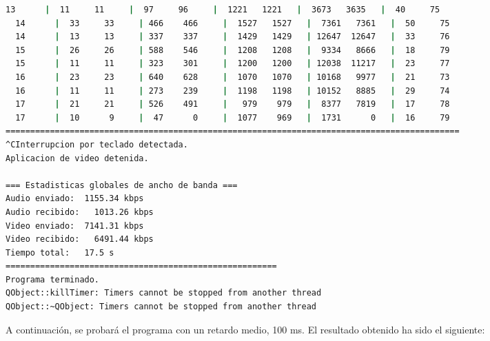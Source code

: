 \begin{adjustbox}{max width=\textwidth}
\begin{lstlisting}[language=bash,basicstyle=\ttfamily\scriptsize]
  13      |  11     11     |  97     96     |  1221   1221   |  3673   3635   |  40     75
  14      |  33     33     | 466    466     |  1527   1527   |  7361   7361   |  50     75
  14      |  13     13     | 337    337     |  1429   1429   | 12647  12647   |  33     76
  15      |  26     26     | 588    546     |  1208   1208   |  9334   8666   |  18     79
  15      |  11     11     | 323    301     |  1200   1200   | 12038  11217   |  23     77
  16      |  23     23     | 640    628     |  1070   1070   | 10168   9977   |  21     73
  16      |  11     11     | 273    239     |  1198   1198   | 10152   8885   |  29     74
  17      |  21     21     | 526    491     |   979    979   |  8377   7819   |  17     78
  17      |  10      9     |  47      0     |  1077    969   |  1731      0   |  16     79
============================================================================================
^CInterrupcion por teclado detectada.
Aplicacion de video detenida.

=== Estadisticas globales de ancho de banda ===
Audio enviado:	1155.34 kbps
Audio recibido:   1013.26 kbps
Video enviado:	7141.31 kbps
Video recibido:   6491.44 kbps
Tiempo total: 	17.5 s
=======================================================
Programa terminado.
QObject::killTimer: Timers cannot be stopped from another thread
QObject::~QObject: Timers cannot be stopped from another thread
\end{lstlisting}
\end{adjustbox}
\vspace{\baselineskip}

\newpage

A continuación, se probará el programa con un retardo medio, 100 ms. El resultado obtenido ha sido el siguiente:
\vspace{\baselineskip}

